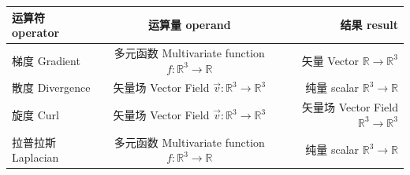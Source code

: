 \documentclass[
]{book}
\begin{document}
\begin{longtable}[]{@{}lcr@{}}
\toprule
\begin{minipage}[b]{0.28\columnwidth}\raggedright
运算符 operator\strut
\end{minipage} & \begin{minipage}[b]{0.34\columnwidth}\centering
运算量 operand\strut
\end{minipage} & \begin{minipage}[b]{0.28\columnwidth}\raggedleft
结果 result\strut
\end{minipage}\tabularnewline
\midrule
\endhead
\begin{minipage}[t]{0.28\columnwidth}\raggedright
梯度 Gradient\strut
\end{minipage} & \begin{minipage}[t]{0.34\columnwidth}\centering
多元函数 Multivariate function \(f:\mathbb{R}^3 \to \mathbb{R}\)\strut
\end{minipage} & \begin{minipage}[t]{0.28\columnwidth}\raggedleft
矢量 Vector \(\mathbb{R} \to \mathbb{R}^3\)\strut
\end{minipage}\tabularnewline
\begin{minipage}[t]{0.28\columnwidth}\raggedright
散度 Divergence\strut
\end{minipage} & \begin{minipage}[t]{0.34\columnwidth}\centering
矢量场 Vector Field \(\vec{v}: \mathbb{R}^3 \to \mathbb{R}^3\)\strut
\end{minipage} & \begin{minipage}[t]{0.28\columnwidth}\raggedleft
纯量 scalar \(\mathbb{R}^3 \to \mathbb{R}\)\strut
\end{minipage}\tabularnewline
\begin{minipage}[t]{0.28\columnwidth}\raggedright
旋度 Curl\strut
\end{minipage} & \begin{minipage}[t]{0.34\columnwidth}\centering
矢量场 Vector Field \(\vec{v}: \mathbb{R}^3 \to \mathbb{R}^3\)\strut
\end{minipage} & \begin{minipage}[t]{0.28\columnwidth}\raggedleft
矢量场 Vector Field \(\mathbb{R}^3 \to \mathbb{R}^3\)\strut
\end{minipage}\tabularnewline
\begin{minipage}[t]{0.28\columnwidth}\raggedright
拉普拉斯 Laplacian\strut
\end{minipage} & \begin{minipage}[t]{0.34\columnwidth}\centering
多元函数 Multivariate function \(f:\mathbb{R}^3 \to \mathbb{R}\)\strut
\end{minipage} & \begin{minipage}[t]{0.28\columnwidth}\raggedleft
纯量 scalar \(\mathbb{R}^3 \to \mathbb{R}\)\strut
\end{minipage}\tabularnewline
\bottomrule
\end{longtable}
\end{document}

